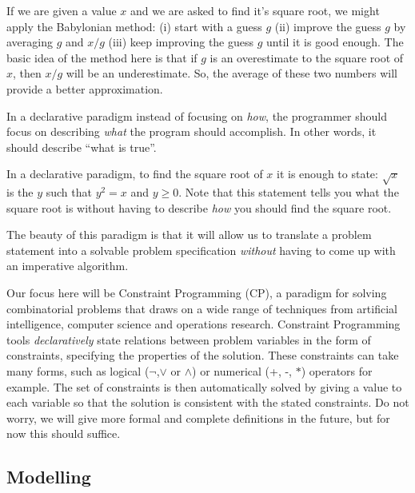 \begin{example}
If we are given a value $x$ and we are asked to find it's square root, we might
apply the Babylonian method: (i) start with a guess $g$ (ii) improve the
guess $g$ by averaging $g$ and $x/g$ (iii) keep improving the guess $g$
until it is good enough.
%
The basic idea of the method here is that if $g$ is an overestimate to the
square root of $x$, then $x/g$ will be an underestimate. So, the average of
these two numbers will provide a better approximation.
\end{example}

In a declarative paradigm instead of focusing on \emph{how}, the programmer
should focus on describing \emph{what} the program should accomplish. 
In other words, it should describe ``what is true''.

\begin{example}
In a declarative paradigm, to find the square root of $x$ it is enough to 
state: $\sqrt{x}$ is the $y$ such that $y^2 = x$ and $y \geq 0$.
%
Note that this statement tells you what the square root is without having to
describe \emph{how} you should find the square root. 
\end{example}

The beauty of this paradigm is that it will allow us to translate a problem
statement into a solvable problem specification \emph{without} having to come
up with an imperative algorithm. 


Our focus here will be Constraint Programming (CP), a paradigm for solving
combinatorial problems that draws on a wide range of techniques from artificial
intelligence, computer science and operations research. 
%
Constraint Programming tools \emph{declaratively} state relations between problem
variables in the form of constraints, specifying the properties of the
solution. These constraints can take many forms, such as logical ($\neg$,$\vee$
or $\wedge$) or numerical (+, -, $*$) operators for example.
%
The set of constraints is then automatically solved by giving a value to each
variable so that the solution is consistent with the stated constraints. Do
not worry, we will give more formal and complete definitions in the future, but
for now this should suffice.

\subsection{Modelling}

